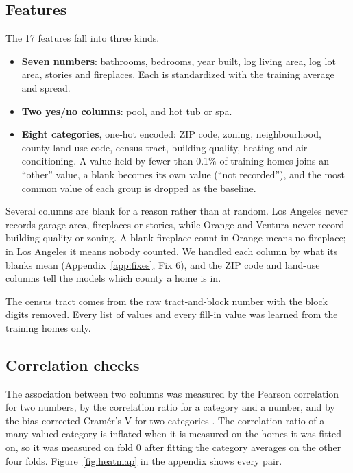 \documentclass[sigconf,nonacm,10pt]{acmart}
\begin{document}
\subsection{Features}
The 17 features fall into three kinds.
\begin{itemize}
\item \textbf{Seven numbers}: bathrooms, bedrooms, year built, log living area, log lot area, stories and fireplaces. Each is standardized with the training average and spread.
\item \textbf{Two yes/no columns}: pool, and hot tub or spa.
\item \textbf{Eight categories}, one-hot encoded: ZIP code, zoning, neighbourhood, county land-use code, census tract, building quality, heating and air conditioning. A value held by fewer than 0.1\% of training homes joins an ``other'' value, a blank becomes its own value (``not recorded''), and the most common value of each group is dropped as the baseline.
\end{itemize}

Several columns are blank for a reason rather than at random. Los Angeles never records garage area, fireplaces or stories, while Orange and Ventura never record building quality or zoning. A blank fireplace count in Orange means no fireplace; in Los Angeles it means nobody counted. We handled each column by what its blanks mean (Appendix~\ref{app:fixes}, Fix 6), and the ZIP code and land-use columns tell the models which county a home is in.

The census tract comes from the raw tract-and-block number with the block digits removed. Every list of values and every fill-in value was learned from the training homes only.

\subsection{Correlation checks}
\label{sec:checks}
The association between two columns was measured by the Pearson correlation for two numbers, by the correlation ratio for a category and a number, and by the bias-corrected Cram\'er's V for two categories \cite{cramer1946,bergsma2013}. The correlation ratio of a many-valued category is inflated when it is measured on the homes it was fitted on, so it was measured on fold 0 after fitting the category averages on the other four folds. Figure~\ref{fig:heatmap} in the appendix shows every pair.
\end{document}
